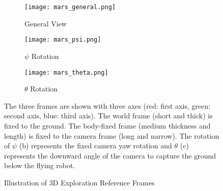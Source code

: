 
\begin{figure}[!t]
	\centering
	\begin{subfigure}[t]{0.3\columnwidth}
           	\centering
          	\texttt{[image: mars\_general.png]}
        		\caption{General View}
    	\end{subfigure}
    	\begin{subfigure}[t]{0.3\columnwidth}
           	\centering
          	\texttt{[image: mars\_psi.png]}
        		\caption{$\psi$ Rotation}
    	\end{subfigure}
	\begin{subfigure}[t]{0.3\columnwidth}
           	\centering
          	\texttt{[image: mars\_theta.png]}
        		\caption{$\theta$ Rotation}
    	\end{subfigure}
	\caption{Illustration of 3D Exploration Reference Frames}
	\medskip
	\small
	The three frames are shown with three axes (red: first axis, green: second axis, blue: third axis). The world frame (short and thick) is fixed to the ground. The body-fixed frame (medium thickness and length) is fixed to the camera frame (long and narrow). The rotation of $\psi$ (b) represents the fixed camera yaw rotation and $\theta$ (c) represents the downward angle of the camera to capture the ground below the flying robot.
	\label{fig:transforms}
\end{figure}


